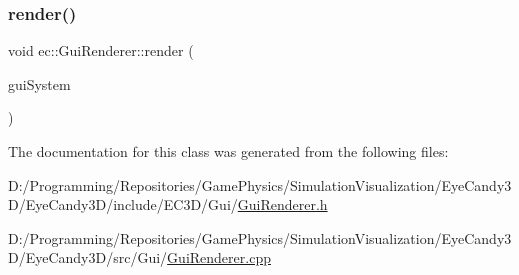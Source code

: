 \mbox{\label{classec_1_1_gui_renderer_af9573af245feb6ab252fb6c060344e7b}} 
\subsubsection{\texorpdfstring{render()}{render()}}
{\footnotesize\ttfamily void ec\+::\+Gui\+Renderer\+::render (\begin{DoxyParamCaption}\item[{const \mbox{\hyperlink{classec_1_1_gui_system}{Gui\+System}} \&}]{gui\+System }\end{DoxyParamCaption})}



The documentation for this class was generated from the following files\+:\begin{DoxyCompactItemize}
\item 
D\+:/\+Programming/\+Repositories/\+Game\+Physics/\+Simulation\+Visualization/\+Eye\+Candy3\+D/\+Eye\+Candy3\+D/include/\+E\+C3\+D/\+Gui/\mbox{\hyperlink{_gui_renderer_8h}{Gui\+Renderer.\+h}}\item 
D\+:/\+Programming/\+Repositories/\+Game\+Physics/\+Simulation\+Visualization/\+Eye\+Candy3\+D/\+Eye\+Candy3\+D/src/\+Gui/\mbox{\hyperlink{_gui_renderer_8cpp}{Gui\+Renderer.\+cpp}}\end{DoxyCompactItemize}
